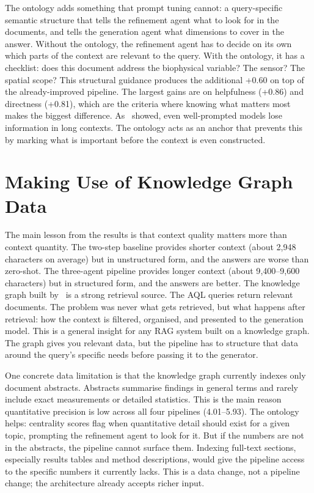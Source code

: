 The ontology adds something that prompt tuning cannot: a query-specific semantic structure that tells the refinement agent what to look for in the documents, and tells the generation agent what dimensions to cover in the answer. Without the ontology, the refinement agent has to decide on its own which parts of the context are relevant to the query. With the ontology, it has a checklist: does this document address the biophysical variable? The sensor? The spatial scope? This structural guidance produces the additional +0.60 on top of the already-improved pipeline. The largest gains are on helpfulness (+0.86) and directness (+0.81), which are the criteria where knowing what matters most makes the biggest difference. As~\citet{liu2024lost} showed, even well-prompted models lose information in long contexts. The ontology acts as an anchor that prevents this by marking what is important before the context is even constructed.


\section{Making Use of Knowledge Graph Data}
\label{sec:discuss-kg-data}

The main lesson from the results is that context quality matters more than context quantity. The two-step baseline provides shorter context (about 2{,}948 characters on average) but in unstructured form, and the answers are worse than zero-shot. The three-agent pipeline provides longer context (about 9{,}400--9{,}600 characters) but in structured form, and the answers are better. The knowledge graph built by~\citet{elbaff2025earthobservationrag} is a strong retrieval source. The AQL queries return relevant documents. The problem was never what gets retrieved, but what happens after retrieval: how the context is filtered, organised, and presented to the generation model. This is a general insight for any RAG system built on a knowledge graph. The graph gives you relevant data, but the pipeline has to structure that data around the query's specific needs before passing it to the generator.

One concrete data limitation is that the knowledge graph currently indexes only document abstracts. Abstracts summarise findings in general terms and rarely include exact measurements or detailed statistics. This is the main reason quantitative precision is low across all four pipelines (4.01--5.93). The ontology helps: centrality scores flag when quantitative detail should exist for a given topic, prompting the refinement agent to look for it. But if the numbers are not in the abstracts, the pipeline cannot surface them. Indexing full-text sections, especially results tables and method descriptions, would give the pipeline access to the specific numbers it currently lacks. This is a data change, not a pipeline change; the architecture already accepts richer input.



